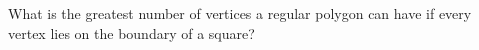 What is the greatest number of vertices a regular polygon can have if every vertex lies on the boundary of a square?
